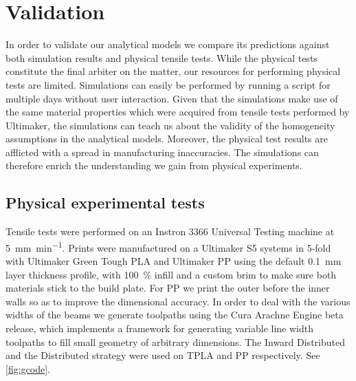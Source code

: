 \section{Validation}
In order to validate our analytical models we compare its predictions against both simulation results and physical tensile tests.
While the physical tests constitute the final arbiter on the matter,
our resources for performing physical tests are limited.
Simulations can easily be performed by running a script for multiple days without user interaction.
Given that the simulations make use of the same material properties which were acquired from tensile tests performed by Ultimaker,
the simulations can teach us about the validity of the homogeneity assumptions in the analytical models.
Moreover, the physical test results are afflicted with a spread in manufacturing inaccuracies.
The simulations can therefore enrich the understanding we gain from physical experiments.







\subsection{Physical experimental tests}
Tensile tests were performed on an Instron 3366 Universal Testing machine at \SI{5}{\milli\meter\per\minute}.
Prints were manufactured on a Ultimaker S5 systems in 5-fold with Ultimaker Green Tough PLA and Ultimaker PP using the default \SI{0.1}{\milli\meter} layer thickness profile,
with \SI{100}{\percent} infill and a custom brim to make sure both materials stick to the build plate.
For PP we print the outer before the inner walls so as to improve the dimensional accuracy. %
In order to deal with the various widths of the beams we generate toolpaths using the Cura Arachne Engine beta release\cite{CuraArachne},
which implements a framework for generating variable line width toolpaths to fill small geometry of arbitrary dimensions\cite{Kuipers2020}.
The Inward Distributed and the Distributed strategy were used on TPLA and PP respectively.
See \cref{fig:gcode}.



